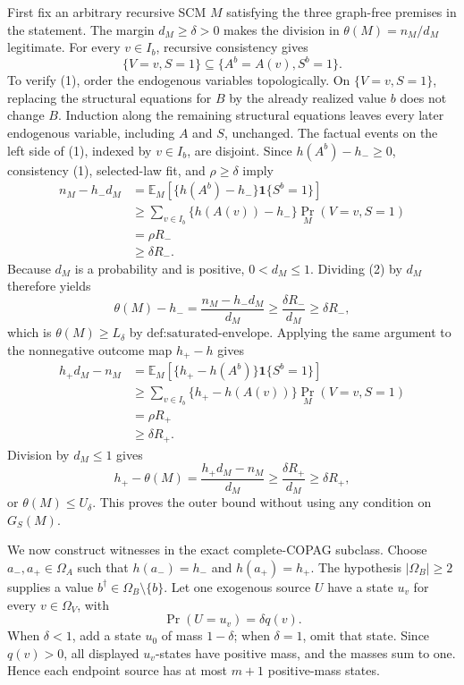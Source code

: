 First fix an arbitrary recursive SCM \(M\) satisfying the three graph-free premises in the statement.  The margin \(d_M\geq\delta>0\) makes the division in \(\theta(M)=n_M/d_M\) legitimate.  For every \(v\in I_b\), recursive consistency gives
\[
\{V=v,S=1\}\subseteq\{A^b=A(v),S^b=1\}. \tag{1}
\]
To verify (1), order the endogenous variables topologically.  On \(\{V=v,S=1\}\), replacing the structural equations for \(B\) by the already realized value \(b\) does not change \(B\).  Induction along the remaining structural equations leaves every later endogenous variable, including \(A\) and \(S\), unchanged.  The factual events on the left side of (1), indexed by \(v\in I_b\), are disjoint.  Since \(h(A^b)-h_-\geq0\), consistency (1), selected-law fit, and \(\rho\geq\delta\) imply
\[
\begin{aligned}
n_M-h_-d_M
&=\mathbb E_M\!\left[\{h(A^b)-h_-\}\mathbf 1\{S^b=1\}\right]\\
&\geq\sum_{v\in I_b}\{h(A(v))-h_-\}\Pr_M(V=v,S=1)\\
&=\rho R_-\\
&\geq\delta R_-.
\end{aligned} \tag{2}
\]
Because \(d_M\) is a probability and is positive, \(0<d_M\leq1\).  Dividing (2) by \(d_M\) therefore yields
\[
\theta(M)-h_-
=\frac{n_M-h_-d_M}{d_M}
\geq\frac{\delta R_-}{d_M}
\geq\delta R_-,
\]
which is \(\theta(M)\geq L_\delta\) by \(\text{def:saturated-envelope}\).  Applying the same argument to the nonnegative outcome map \(h_+-h\) gives
\[
\begin{aligned}
h_+d_M-n_M
&=\mathbb E_M\!\left[\{h_+-h(A^b)\}\mathbf 1\{S^b=1\}\right]\\
&\geq\sum_{v\in I_b}\{h_+-h(A(v))\}\Pr_M(V=v,S=1)\\
&=\rho R_+\\
&\geq\delta R_+.
\end{aligned} \tag{3}
\]
Division by \(d_M\leq1\) gives
\[
h_+-\theta(M)
=\frac{h_+d_M-n_M}{d_M}
\geq\frac{\delta R_+}{d_M}
\geq\delta R_+,
\]
or \(\theta(M)\leq U_\delta\).  This proves the outer bound without using any condition on \(G_S(M)\).

We now construct witnesses in the exact complete-COPAG subclass.  Choose \(a_-,a_+\in\Omega_A\) such that \(h(a_-)=h_-\) and \(h(a_+)=h_+\).  The hypothesis \(|\Omega_B|\geq2\) supplies a value \(b^\dagger\in\Omega_B\setminus\{b\}\).  Let one exogenous source \(U\) have a state \(u_v\) for every \(v\in\Omega_V\), with
\[
\Pr(U=u_v)=\delta q(v).
\]
When \(\delta<1\), add a state \(u_0\) of mass \(1-\delta\); when \(\delta=1\), omit that state.  Since \(q(v)>0\), all displayed \(u_v\)-states have positive mass, and the masses sum to one.  Hence each endpoint source has at most \(m+1\) positive-mass states.

